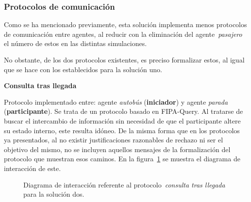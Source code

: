 \subsubsection{Protocolos de comunicación}\label{subsubsec:comms_protocols_two}
Como se ha mencionado previamente, esta solución implementa menos protocolos de comunicación entre agentes, al reducir con la eliminación
del agente~\textit{pasajero} el número de estos en las distintas simulaciones.

No obstante, de los dos protocolos existentes, es preciso formalizar estos, al igual que se hace con los establecidos para la solución uno.

\medskip
\noindent\textbf{Consulta tras llegada}

Protocolo implementado entre: agente \textit{autobús} (\textbf{iniciador}) y agente \textit{parada} (\textbf{participante}). Se trata 
de un protocolo basado en FIPA-Query. Al tratarse de buscar el intercambio de información sin necesidad de que el 
participante altere su estado interno, este resulta idóneo. De la misma forma que en los protocolos ya presentados, al no existir
justificaciones razonables de rechazo ni ser el objetivo del mismo, no se incluyen aquellos mensajes de la formalización del 
protocolo que muestran esos caminos. En la figura~\ref{fig:consulta_tras_llegada} se muestra el diagrama de interacción de este.

\begin{figure}[H]
 \centering
    
\caption{Diagrama de interacción referente al protocolo~\textit{consulta tras llegada} para la solución dos.}
\par\vspace{4pt}{\footnotesize Fuente: elaboración propia.}\label{fig:consulta_tras_llegada}
\end{figure}


